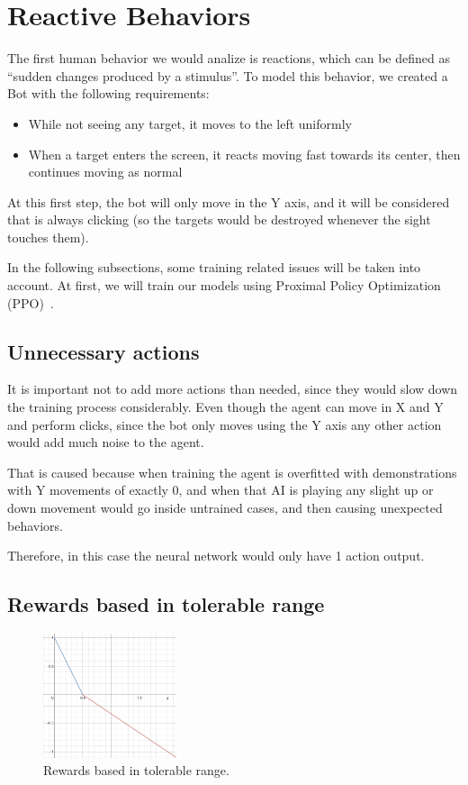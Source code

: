 \section{Reactive Behaviors}

The first human behavior we would analize is reactions, which can be defined as ``sudden changes produced by a stimulus''. To model this behavior, we created a Bot with the following requirements:

\begin{itemize}
 \item While not seeing any target, it moves to the left uniformly
 \item When a target enters the screen, it reacts moving fast towards its center, then continues moving as normal
\end{itemize}

At this first step, the bot will only move in the Y axis, and it will be considered that is always clicking (so the targets would be destroyed whenever the sight touches them).

In the following subsections, some training related issues will be taken into account. At first, we will train our models using Proximal Policy Optimization (PPO)~\cite{ppopolicy}.

\subsection{Unnecessary actions}
It is important not to add more actions than needed, since they would slow down the training process considerably. Even though the agent can move in X and Y and perform clicks, since the bot only moves using the Y axis any other action would add much noise to the agent. 

That is caused because when training the agent is overfitted with demonstrations with Y movements of exactly 0, and when that AI is playing any slight up or down movement would go inside untrained cases, and then causing unexpected behaviors.

Therefore, in this case the neural network would only have 1 action output.

\subsection{Rewards based in tolerable range}

\begin{figure}
    \centering
    \includegraphics[width=0.35\textwidth]{img/rewTR.png}
		\caption{Rewards based in tolerable range.}
		\label{fig:trange}
\end{figure}

